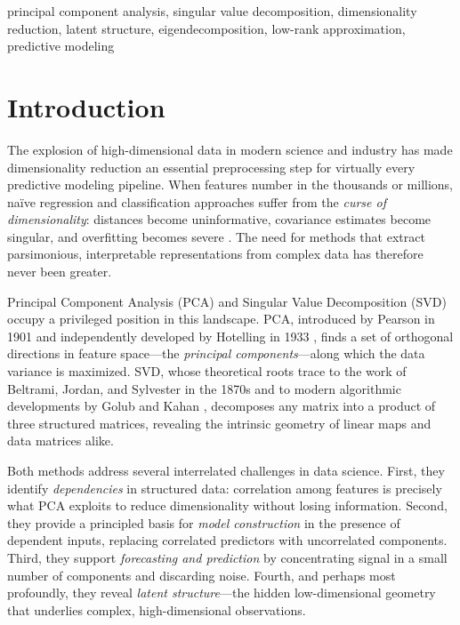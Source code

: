 \documentclass[conference]{IEEEtran}
\begin{document}
\begin{IEEEkeywords}
principal component analysis, singular value decomposition, dimensionality reduction, latent structure, eigendecomposition, low-rank approximation, predictive modeling
\end{IEEEkeywords}

\section{Introduction}

The explosion of high-dimensional data in modern science and industry has made dimensionality reduction an essential preprocessing step for virtually every predictive modeling pipeline. When features number in the thousands or millions, na\"{i}ve regression and classification approaches suffer from the \emph{curse of dimensionality}: distances become uninformative, covariance estimates become singular, and overfitting becomes severe \cite{bellman1957}. The need for methods that extract parsimonious, interpretable representations from complex data has therefore never been greater.

Principal Component Analysis (PCA) and Singular Value Decomposition (SVD) occupy a privileged position in this landscape. PCA, introduced by Pearson in 1901 \cite{pearson1901} and independently developed by Hotelling in 1933 \cite{hotelling1933}, finds a set of orthogonal directions in feature space—the \emph{principal components}—along which the data variance is maximized. SVD, whose theoretical roots trace to the work of Beltrami, Jordan, and Sylvester in the 1870s and to modern algorithmic developments by Golub and Kahan \cite{golub1965}, decomposes any matrix into a product of three structured matrices, revealing the intrinsic geometry of linear maps and data matrices alike.

Both methods address several interrelated challenges in data science. First, they identify \emph{dependencies} in structured data: correlation among features is precisely what PCA exploits to reduce dimensionality without losing information. Second, they provide a principled basis for \emph{model construction} in the presence of dependent inputs, replacing correlated predictors with uncorrelated components. Third, they support \emph{forecasting and prediction} by concentrating signal in a small number of components and discarding noise. Fourth, and perhaps most profoundly, they reveal \emph{latent structure}—the hidden low-dimensional geometry that underlies complex, high-dimensional observations.
\end{document}
